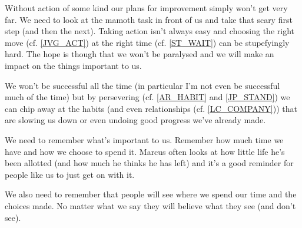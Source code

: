 \cleardoublepage
\begin{multicols}{2}

Without action of some kind our plans for improvement simply won't get very far. We need to look at the mamoth task in front of us and take that scary first step (and then the next). 
Taking action isn't always easy and choosing the right move (cf. \ref{JVG_ACT}) at the right time (cf. \ref{ST_WAIT}) can be stupefyingly hard.
The hope is though that we won't be paralysed and we will make an impact on the things important to us.

We won't be successful all the time (in particular I'm not even be successful much of the time) but by persevering (cf. \ref{AR_HABIT} and \ref{JP_STAND}) we can chip away at the habits (and even relationships (cf. \ref{LC_COMPANY})) that are slowing us down or even undoing good progress we've already made.

We need to remember what's important to us. Remember how much time we have and how we choose to spend it. Marcus often looks at how little life he's been allotted (and how much he thinks he has left) and it's a good reminder for people like us to just get on with it.

We also need to remember that people will see where we spend our time and the choices made. No matter what we say they will believe what they see (and don't see). 

\end{multicols}
\clearpage
